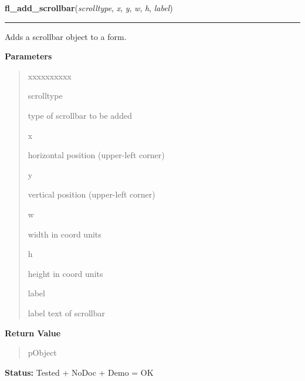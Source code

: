\hspace{.8\funcindent}\begin{boxedminipage}{\funcwidth}

    \raggedright \textbf{fl\_add\_scrollbar}(\textit{scrolltype}, \textit{x}, \textit{y}, \textit{w}, \textit{h}, \textit{label})

    \vspace{-1.5ex}

    \rule{\textwidth}{0.5\fboxrule}
\setlength{\parskip}{2ex}
    Adds a scrollbar object to a form.

\setlength{\parskip}{1ex}
      \textbf{Parameters}
      \vspace{-1ex}

      \begin{quote}
        \begin{Ventry}{xxxxxxxxxx}

          \item[scrolltype]

          type of scrollbar to be added

          \item[x]

          horizontal position (upper-left corner)

          \item[y]

          vertical position (upper-left corner)

          \item[w]

          width in coord units

          \item[h]

          height in coord units

          \item[label]

          label text of scrollbar

        \end{Ventry}

      \end{quote}

      \textbf{Return Value}
    \vspace{-1ex}

      \begin{quote}
      pObject

      \end{quote}

\textbf{Status:} Tested + NoDoc + Demo = OK



    \end{boxedminipage}

